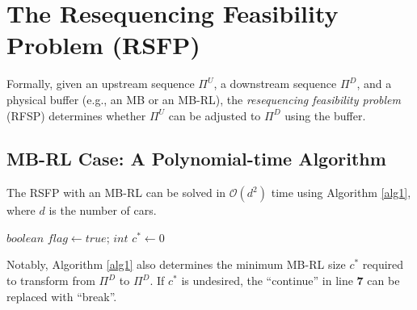 \documentclass[12pt]{article}
\begin{document}
\section{The Resequencing Feasibility Problem (RSFP)}\label{app-sec2}
Formally, given an upstream sequence $\Pi^U$, a downstream sequence $\Pi^D$, and a physical buffer (e.g., an MB or an MB-RL), the \textit{resequencing feasibility problem} (RFSP) determines whether $\Pi^U$ can be adjusted to $\Pi^D$ using the buffer.

\subsection{MB-RL Case: A Polynomial-time Algorithm}
The RSFP with an MB-RL can be solved in $\mathcal{O}(d^2)$ time using Algorithm \ref{alg1}, where $d$ is the number of cars.
\begin{algorithm}[htp]\label{alg1}
    \LinesNumbered
    \caption{Resequencing Feasibility Check for the \textit{RSFP} with an MB-RL}

    $boolean$ $flag \gets true$; $int$ $c^{*} \gets 0$\;

\end{algorithm}

Notably, Algorithm \ref{alg1} also determines the minimum MB-RL size $c^*$ required to transform from $\Pi^D$ to $\Pi^D$. If $c^*$ is undesired, the ``continue'' in line \textbf{7} can be replaced with ``break''.
\end{document}

